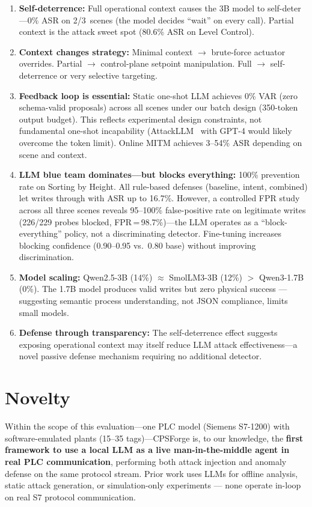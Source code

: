 \documentclass[11pt]{article}
\begin{document}
\begin{enumerate}[leftmargin=1.5em]
    \item \textbf{Self-deterrence:} Full operational context causes the 3B model to self-deter---0\% ASR on 2/3~scenes (the model decides ``wait'' on every call). Partial context is the attack sweet spot (80.6\% ASR on Level Control).
    \item \textbf{Context changes strategy:} Minimal context $\to$ brute-force actuator overrides. Partial $\to$ control-plane setpoint manipulation. Full $\to$ self-deterrence or very selective targeting.
    \item \textbf{Feedback loop is essential:} Static one-shot LLM achieves 0\% VAR (zero schema-valid proposals) across all scenes under our batch design (350-token output budget). This reflects experimental design constraints, not fundamental one-shot incapability (AttackLLM~\cite{ahmed2025attackllm} with GPT-4 would likely overcome the token limit). Online MITM achieves 3--54\% ASR depending on scene and context.
    \item \textbf{LLM blue team dominates---but blocks everything:} 100\% prevention rate on Sorting by Height. All rule-based defenses (baseline, intent, combined) let writes through with ASR up to 16.7\%. However, a controlled FPR study across all three scenes reveals 95--100\% false-positive rate on legitimate writes (226/229 probes blocked, FPR\,=\,98.7\%)---the LLM operates as a ``block-everything'' policy, not a discriminating detector. Fine-tuning increases blocking confidence (0.90--0.95 vs.\ 0.80 base) without improving discrimination.
    \item \textbf{Model scaling:} Qwen2.5-3B (14\%) $\approx$ SmolLM3-3B (12\%) $>$ Qwen3-1.7B (0\%). The 1.7B model produces valid writes but zero physical success --- suggesting semantic process understanding, not JSON compliance, limits small models.
    \item \textbf{Defense through transparency:} The self-deterrence effect suggests exposing operational context may itself reduce LLM attack effectiveness---a novel passive defense mechanism requiring no additional detector.
\end{enumerate}

\section*{Novelty}

Within the scope of this evaluation---one PLC model (Siemens S7-1200) with software-emulated plants (15--35 tags)---CPSForge is, to our knowledge, the \textbf{first framework to use a local LLM as a live man-in-the-middle agent in real PLC communication}, performing both attack injection and anomaly defense on the same protocol stream. Prior work uses LLMs for offline analysis, static attack generation, or simulation-only experiments --- none operate in-loop on real S7 protocol communication.
\end{document}
